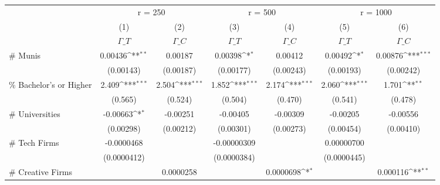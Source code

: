 {
\def\sym#1{\ifmmode^{#1}\else\(^{#1}\)\fi}
\begin{tabular}{l*{6}{c}}
\toprule
                    &\multicolumn{2}{c}{r = 250}                &\multicolumn{2}{c}{r = 500}                &\multicolumn{2}{c}{r = 1000}               \\
                    &\multicolumn{1}{c}{(1)}&\multicolumn{1}{c}{(2)}&\multicolumn{1}{c}{(3)}&\multicolumn{1}{c}{(4)}&\multicolumn{1}{c}{(5)}&\multicolumn{1}{c}{(6)}\\
                    &\multicolumn{1}{c}{\(\Gamma\_T\)}&\multicolumn{1}{c}{\(\Gamma\_C\)}&\multicolumn{1}{c}{\(\Gamma\_T\)}&\multicolumn{1}{c}{\(\Gamma\_C\)}&\multicolumn{1}{c}{\(\Gamma\_T\)}&\multicolumn{1}{c}{\(\Gamma\_C\)}\\
\midrule
\# Munis            &     0.00436\sym{**} &     0.00187         &     0.00398\sym{*}  &     0.00412         &     0.00492\sym{*}  &     0.00876\sym{***}\\
                    &   (0.00143)         &   (0.00187)         &   (0.00177)         &   (0.00243)         &   (0.00193)         &   (0.00242)         \\
\addlinespace
\% Bachelor's or Higher&       2.409\sym{***}&       2.504\sym{***}&       1.852\sym{***}&       2.174\sym{***}&       2.060\sym{***}&       1.701\sym{**} \\
                    &     (0.565)         &     (0.524)         &     (0.504)         &     (0.470)         &     (0.541)         &     (0.478)         \\
\addlinespace
\# Universities     &    -0.00663\sym{*}  &    -0.00251         &    -0.00405         &    -0.00309         &    -0.00205         &    -0.00556         \\
                    &   (0.00298)         &   (0.00212)         &   (0.00301)         &   (0.00273)         &   (0.00454)         &   (0.00410)         \\
\addlinespace
\# Tech Firms       &  -0.0000468         &                     & -0.00000309         &                     &  0.00000700         &                     \\
                    & (0.0000412)         &                     & (0.0000384)         &                     & (0.0000445)         &                     \\
\addlinespace
\# Creative Firms   &                     &   0.0000258         &                     &   0.0000698\sym{*}  &                     &    0.000116\sym{**} \\

\end{tabular}}
